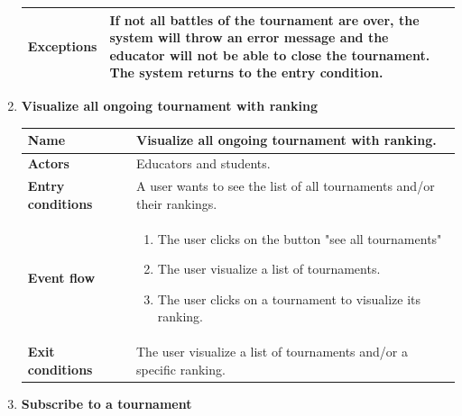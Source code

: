 \begin{enumerate}[label=\textbf{UC.\arabic*}]
\begin{table}[H]
\begin{tabular}{|m{3.2cm}|m{9.8cm}|}
                    \hline
                    \textbf{Exceptions}  & If not all battles of the tournament are over, the system will throw an error message and the educator will not be able to close the tournament. The system returns to the entry condition.\\
                    \hline 
                \end{tabular}
        \end{table}
        \item {} \textbf{Visualize all ongoing tournament with ranking}
        \begin{table}[H]
    	    \centering
                \renewcommand{\arraystretch}{1.5}
                \begin{tabular}{|m{3.2cm}|m{9.8cm}|}
                    \hline
                    \textbf{Name} & Visualize all ongoing tournament with ranking.  \\
                    \hline
                    \textbf{Actors} & Educators and students. \\
                    \hline
                    \textbf{Entry conditions}  & A user wants to see the list of all tournaments and/or their rankings. \\
                    \hline
                    \textbf{Event flow}  & 
                    \begin{enumerate}[label=\arabic*.]
                        \item The user clicks on the button "see all tournaments"
                        \item The user visualize a list of tournaments.
                        \item The user clicks on a tournament to visualize its ranking.
                    \end{enumerate}\\
                    \hline
                    \textbf{Exit conditions}  & The user visualize a list of tournaments and/or a specific ranking. \\
                    \hline
                \end{tabular}
        \end{table}
        \item {} \textbf{Subscribe to a tournament}
        \begin{table}[H]
    	    \centering
                \renewcommand{\arraystretch}{1.5}
                \begin{tabular}{|m{3.2cm}|m{9.8cm}|}

\end{tabular}
\end{table}
\end{enumerate}
